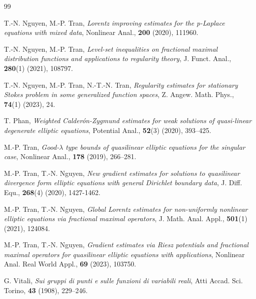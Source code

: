 \documentclass[a4paper, 11pt]{article}
\begin{document}
\begin{thebibliography}{99}




 T.-N. Nguyen, M.-P. Tran, {\em Lorentz improving estimates for the p-Laplace equations with mixed data}, Nonlinear Anal., {\bf 200} (2020), 111960.

 T.-N. Nguyen, M.-P. Tran, {\em Level-set inequalities on fractional maximal distribution functions and applications to regularity theory}, J. Funct. Anal., {\bf 280}(1) (2021), 108797.

 T.-N. Nguyen, M.-P. Tran, N.-T.-N. Tran, {\em Regularity estimates for stationary Stokes problem in some generalized function spaces}, Z. Angew. Math. Phys., {\bf 74}(1) (2023), 24.

 T. Phan, {\em Weighted Calder\'on-Zygmund estimates for weak solutions of quasi-linear degenerate elliptic equations}, Potential Anal., {\bf 52}(3) (2020), 393--425.

 M.-P. Tran, {\em Good-$\lambda$ type bounds of quasilinear elliptic equations for the singular case},  Nonlinear Anal., {\bf 178} (2019), 266--281.

 M.-P. Tran, T.-N. Nguyen, {\em New gradient estimates for solutions to quasilinear divergence form elliptic equations with general Dirichlet boundary data}, J. Diff. Equ., {\bf 268}(4) (2020), 1427-1462.

 M.-P. Tran, T.-N. Nguyen, {\em Global Lorentz estimates for non-uniformly nonlinear elliptic equations via fractional maximal operators}, J. Math. Anal. Appl., {\bf 501}(1) (2021), 124084.

 M.-P. Tran, T.-N. Nguyen, {\em Gradient estimates via Riesz potentials and fractional maximal operators for quasilinear elliptic equations with applications}, Nonlinear Anal. Real World Appl., {\bf 69} (2023), 103750.

 G. Vitali, {\em Sui gruppi di punti e sulle funzioni di variabili reali}, Atti Accad. Sci. Torino, {\bf 43} (1908), 229--246.

\end{thebibliography}
\end{document}
